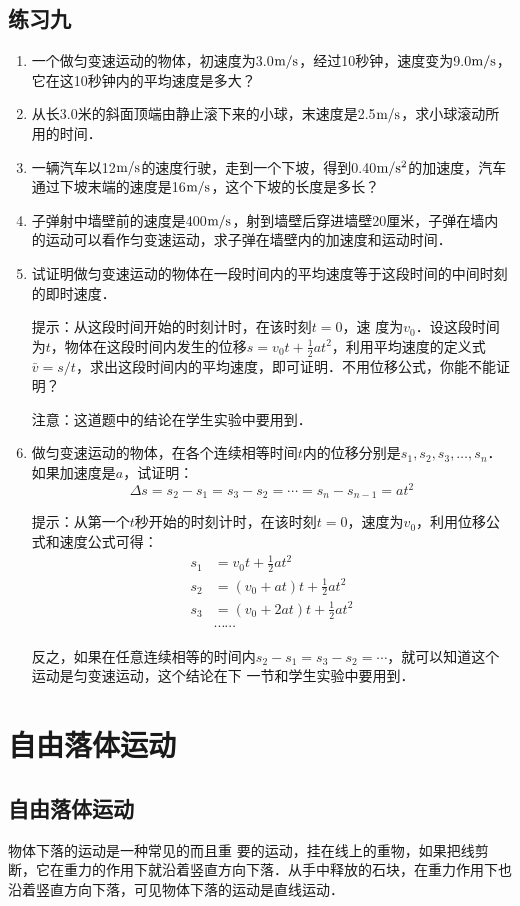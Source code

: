 \subsection*{练习九}
\begin{enumerate}
\item 一个做匀变速运动的物体，初速度为3.0$\text{m}/\text{s}$，经过10秒钟，速度变为9.0$\text{m}/\text{s}$，它在这10秒钟内的平均速度是多大？
\item 从长3.0米的斜面顶端由静止滚下来的小球，末速度是2.5$\text{m}/\text{s}$，求小球滚动所用的时间．
\item 一辆汽车以12$\text{m}/\text{s}$的速度行驶，走到一个下坡，得到0.40$\text{m}/\text{s}^2$的加速度，汽车通过下坡末端的速度是16$\text{m}/\text{s}$，这个下坡的长度是多长？
\item 子弹射中墙壁前的速度是400$\text{m}/\text{s}$，射到墙壁后穿进墙壁20厘米，子弹在墙内的运动可以看作匀变速运动，求子弹在墙壁内的加速度和运动时间．
\item 试证明做匀变速运动的物体在一段时间内的平均速度等于这段时间的中间时刻的即时速度．

提示：从这段时间开始的时刻计时，在该时刻$t=0$，速
度为$v_0$．设这段时间为$t$，物体在这段时间内发生的位移$s=v_0t +\frac{1}{2}at^2$，利用平均速度的定义式$\bar v=s/t$，求出这段时间内的平均速度，即可证明．不用位移公式，你能不能证明？

注意：这道题中的结论在学生实验中要用到．

\item 做匀变速运动的物体，在各个连续相等时间$t$内的位移分别是$s_1, s_2, s_3,\ldots,s_n$．如果加速度是$a$，试证明：
\[\Delta s=s_2-s_1=s_3-s_2=\cdots=s_n-s_{n-1}=at^2 \]

提示：从第一个$t$秒开始的时刻计时，在该时刻$t=0$，速度为$v_0$，利用位移公式和速度公式可得：
\[\begin{split}
s_1&=v_0t +\frac{1}{2}at^2\\
s_2&=(v_0+at)t +\frac{1}{2}at^2\\
s_3&=(v_0+2at)t +\frac{1}{2}at^2\\
&\cdots\cdots
\end{split} \]

反之，如果在任意连续相等的时间内$s_2-s_1=s_3-s_2=\cdots$，就可以知道这个运动是匀变速运动，这个结论在下
一节和学生实验中要用到．
\end{enumerate}

\section{自由落体运动}
\subsection{自由落体运动}
物体下落的运动是一种常见的而且重
要的运动，挂在线上的重物，如果把线剪断，它在重力的作用下就沿着竖直方向下落．从手中释放的石块，在重力作用下也沿着竖直方向下落，可见物体下落的运动是直线运动．

